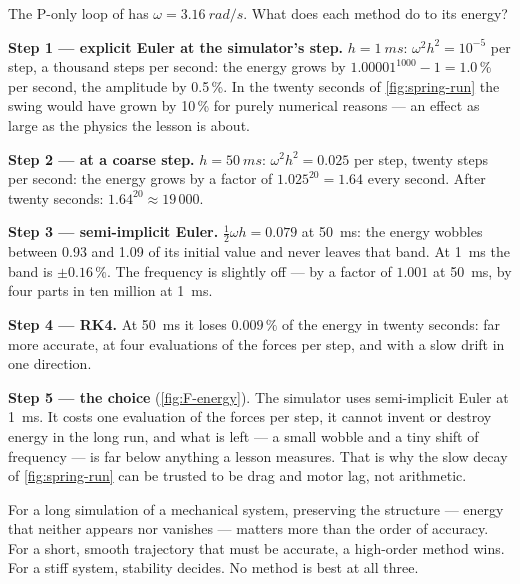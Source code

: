 \begin{example}
\label{ex:F-energy}
The P-only loop of  has $\omega = \SI{3.16}{rad/s}$. What does each method do to its energy?

\textbf{Step 1 — explicit Euler at the simulator's step.} $h = \SI{1}{ms}$: $\omega^2h^2 = 10^{-5}$ per step, a thousand steps per second: the energy grows by $1.00001^{1000} - 1 = 1.0\,\%$ per second, the amplitude by 0.5\,\%. In the twenty seconds of \cref{fig:spring-run} the swing would have grown by 10\,\% for purely numerical reasons — an effect as large as the physics the lesson is about.

\textbf{Step 2 — at a coarse step.} $h = \SI{50}{ms}$: $\omega^2h^2 = 0.025$ per step, twenty steps per second: the energy grows by a factor of $1.025^{20} = 1.64$ every second. After twenty seconds: $1.64^{20} \approx 19\,000$.

\textbf{Step 3 — semi-implicit Euler.} $\tfrac12\omega h = 0.079$ at \SI{50}{ms}: the energy wobbles between 0.93 and 1.09 of its initial value and never leaves that band. At \SI{1}{ms} the band is $\pm0.16\,\%$. The frequency is slightly off — by a factor of $1.001$ at \SI{50}{ms}, by four parts in ten million at \SI{1}{ms}.

\textbf{Step 4 — RK4.} At \SI{50}{ms} it loses $0.009\,\%$ of the energy in twenty seconds: far more accurate, at four evaluations of the forces per step, and with a slow drift in one direction.

\textbf{Step 5 — the choice} (\cref{fig:F-energy}). The simulator uses semi-implicit Euler at \SI{1}{ms}. It costs one evaluation of the forces per step, it cannot invent or destroy energy in the long run, and what is left — a small wobble and a tiny shift of frequency — is far below anything a lesson measures. That is why the slow decay of \cref{fig:spring-run} can be trusted to be drag and motor lag, not arithmetic.
\end{example}


\begin{keyidea}
For a long simulation of a mechanical system, preserving the structure — energy that neither appears nor vanishes — matters more than the order of accuracy. For a short, smooth trajectory that must be accurate, a high-order method wins. For a stiff system, stability decides. No method is best at all three.
\end{keyidea}

